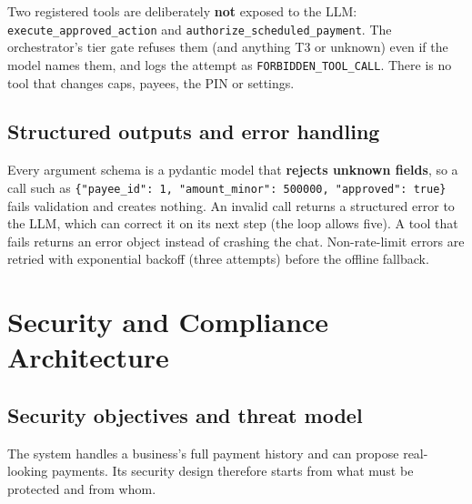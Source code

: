 \documentclass[10pt,a4paper]{article}
\newcommand{\code}[1]{\texttt{\small #1}}
\begin{document}
\endgroup
Two registered tools are deliberately \textbf{not} exposed to the LLM: \code{execute\_approved\_action} and \code{authorize\_scheduled\_payment}. The orchestrator's tier gate refuses them (and anything T3 or unknown) even if the model names them, and logs the attempt as \code{FORBIDDEN\_TOOL\_CALL}. There is no tool that changes caps, payees, the PIN or settings.

\subsection{Structured outputs and error handling}
Every argument schema is a pydantic model that \textbf{rejects unknown fields}, so a call such as \code{\{"payee\_id": 1, "amount\_minor": 500000, "approved": true\}} fails validation and creates nothing. An invalid call returns a structured error to the LLM, which can correct it on its next step (the loop allows five). A tool that fails returns an error object instead of crashing the chat. Non-rate-limit errors are retried with exponential backoff (three attempts) before the offline fallback.

\section{Security and Compliance Architecture}
\label{sec:security}

\subsection{Security objectives and threat model}
\label{sec:threat}
The system handles a business's full payment history and can propose real-looking payments. Its security design therefore starts from what must be protected and from whom.
\end{document}
